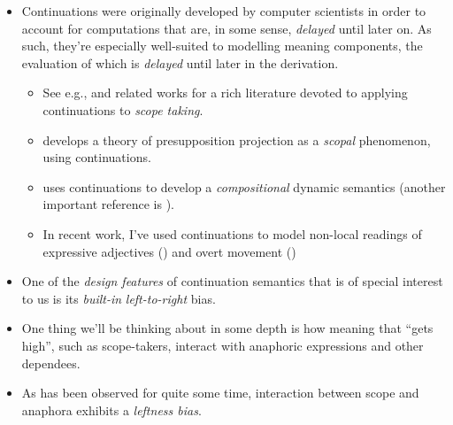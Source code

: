 \documentclass[nols,twoside,nofonts,nobib,nohyper]{tufte-handout}
\begin{document}
\begin{itemize}
    \item Continuations were originally developed by computer scientists in order to account for
    computations that are, in some sense, \textit{delayed} until later on. As
    such, they're especially well-suited to modelling meaning components, the
    evaluation of which is \textit{delayed} until later in the derivation.

    \begin{itemize}

    \item See e.g., \citet{barkerShan2015} and related works for a rich
    literature devoted to applying continuations to \textit{scope taking}.

    \item \citet{grove2019} develops a theory of presupposition projection as a
        \textit{scopal} phenomenon, using continuations.

     \item \citet{deGroote2006} uses continuations to develop a
        \textit{compositional} dynamic semantics (another important reference is \citealt{Charlowc}).

     \item In recent work, I've used continuations to model non-local readings
        of expressive adjectives (\citealt{elliott-fuck}) and overt movement (\citealt{elliott2019movement})

    \end{itemize}

 \item One of the \textit{design features} of continuation semantics that is of
    special interest to us is its \textit{built-in} \textit{left-to-right} bias.

     \item One thing we'll be thinking about in some depth is how meaning that
     \enquote{gets high}, such as scope-takers, interact with anaphoric
     expressions and other dependees.

     \item As has been observed for quite some time, interaction between scope
     and anaphora exhibits a \textit{leftness bias}.

     \begin{fullwidth}
     \begin{multicols}{2}


\end{multicols}
\end{fullwidth}
\end{itemize}
\end{document}
